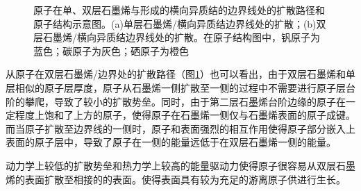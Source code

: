     \begin{figure}[!b]
    \end{figure}
    \begin{figure}\ContinuedFloat
        \caption{原子在单、双层石墨烯与形成的横向异质结的边界线处的扩散路径和原子结构示意图。(a)单层石墨烯/横向异质结边界线处的扩散；(b)双层石墨烯/横向异质结边界线处的扩散。在原子结构图中，钒原子为蓝色；碳原子为灰色；硒原子为橙色}
        \label{fig:VS_structure_VNeb}
    \end{figure}

    从原子在双层石墨烯/边界处的扩散路径（图\ref{fig:VS_structure_VNeb}）也可以看出，由于双层石墨烯和单层相似的原子层厚度，原子从石墨烯一侧扩散至一侧的过程中不需要进行原子层台阶的攀爬，导致了较小的扩散势垒。同时，由于第二层石墨烯台阶边缘的原子在一定程度上饱和了上方的原子，使得原子在石墨烯一侧仅与石墨烯表面的原子成键。而当原子扩散至边界线的一侧时，原子和表面强烈的相互作用使得原子部分嵌入上表面的原子层中，导致了原子在一侧的能量远低于在双层石墨烯一侧的能量。

    动力学上较低的扩散势垒和热力学上较高的能量驱动力使得原子很容易从双层石墨烯的表面扩散至相接的的表面。使得表面具有较为充足的游离原子供进行生长。

